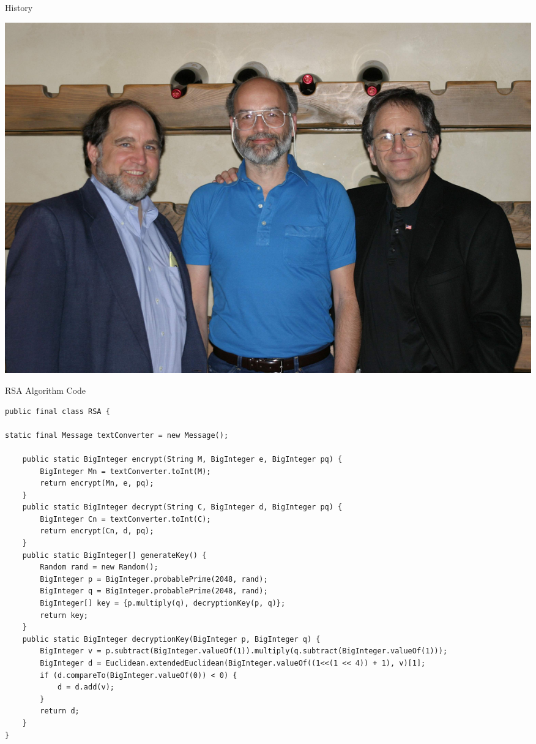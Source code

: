 \documentclass[landscape,fontscale=.4,paperwidth=48in,paperheight=36in]{baposter} %
\begin{document}
\begin{poster}
\begin{posterbox}[name=history, column=13, below=rsa,span=17]{History}
\begin{multicols}{2}
\begin{center}
\includegraphics[width=1\linewidth]{RSA-2003.jpg}
\end{center}
\end{multicols}
\end{posterbox}




\begin{posterbox}[name=code,column=30,span=28,row=0]{RSA Algorithm Code}

{\begin{verbatim}
public final class RSA {

static final Message textConverter = new Message();

    public static BigInteger encrypt(String M, BigInteger e, BigInteger pq) {
        BigInteger Mn = textConverter.toInt(M);
        return encrypt(Mn, e, pq);
    }
    public static BigInteger decrypt(String C, BigInteger d, BigInteger pq) {
        BigInteger Cn = textConverter.toInt(C);
        return encrypt(Cn, d, pq);
    }
    public static BigInteger[] generateKey() {
        Random rand = new Random();
        BigInteger p = BigInteger.probablePrime(2048, rand);
        BigInteger q = BigInteger.probablePrime(2048, rand);
        BigInteger[] key = {p.multiply(q), decryptionKey(p, q)};
        return key;
    }
    public static BigInteger decryptionKey(BigInteger p, BigInteger q) {
        BigInteger v = p.subtract(BigInteger.valueOf(1)).multiply(q.subtract(BigInteger.valueOf(1)));
        BigInteger d = Euclidean.extendedEuclidean(BigInteger.valueOf((1<<(1 << 4)) + 1), v)[1];
        if (d.compareTo(BigInteger.valueOf(0)) < 0) {
            d = d.add(v);
        }
        return d;
    }
}


\end{verbatim}}
\end{posterbox}
\end{poster}
\end{document}
